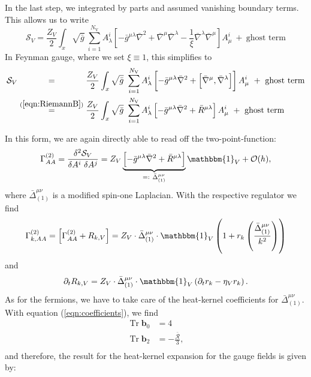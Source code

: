 In the last step, we integrated by parts and assumed vanishing boundary terms.\\
 This allows us to write 
\begin{equation}
\mathcal{S}_V = \frac{Z_{V}}{2} \int_x \sqrt{\bar{g}} \ \sum\limits_{i=1}^{N_{\text{V}}} A_{\lambda}^{i}\left[ - \bar{g}^{\mu\lambda}\bar{\nabla}^2 +  \bar{\nabla}^{\mu}\bar{\nabla}^{\lambda} - \frac{1}{\xi} \bar{\nabla}^{\lambda}\bar{\nabla}^{\mu}\right]A_{\mu}^{i} \ + \ \text{ghost term}
\end{equation}
In Feynman gauge, where we set $\xi \equiv 1$, this simplifies to
\begin{equation}
\begin{aligned}
\mathcal{S}_V &\overset{\phantom{(\mathrm{\ref{eqn:RiemannB}})}}{=} \frac{Z_{V}}{2} \int_x \sqrt{\bar{g}} \ \sum\limits_{i=1}^{N_{\text{V}}} A_{\lambda}^{i}\left[ - \bar{g}^{\mu\lambda}\bar{\nabla}^2 +  \left[\bar{\nabla}^{\mu}, \bar{\nabla}^{\lambda}\right]\right]A_{\mu}^{i} \ + \ \text{ghost term} \\
&\overset{(\mathrm{\ref{eqn:RiemannB}})}{=} \frac{Z_{V}}{2} \int_x \sqrt{\bar{g}} \ \sum\limits_{i=1}^{N_{\text{V}}} A_{\lambda}^{i}\left[ - \bar{g}^{\mu\lambda}\bar{\nabla}^2 +  \bar{R}^{\mu\lambda}\right]A_{\mu}^{i} \ + \ \text{ghost term}
\end{aligned}
\end{equation}

In this form, we are again directly able to read off the two-point-function:
\begin{equation}
	\Gamma^{(2)}_{AA} = \frac{\delta^2 \mathcal{S}_V}{\delta A^{i}\ \delta A^{j}} = Z_V\underbrace{\left[ - \bar{g}^{\mu\lambda}\bar{\nabla}^2 +  \bar{R}^{\mu\lambda}\right]}_{=: \  \bar{\Delta}^{\mu\nu}_{(1)}}\mathbbm{1}_V + \mathcal{O}(h),
\end{equation} 
where $\bar{\Delta}^{\mu\nu}_{(1)}$ is a modified spin-one Laplacian. With the respective regulator we find
\begin{align}
	\Gamma^{(2)}_{k, AA} = \left[\Gamma^{(2)}_{AA}+ R_{k, V}\right]  = Z_V \cdot\bar{\Delta}_{(1)}^{\mu\nu}\cdot\mathbbm{1}_V\left(1 + r_k\left(\frac{\bar{\Delta}_{(1)}^{\mu\nu}}{k^2}\right)\right)
\end{align}
and 
\begin{align}
	\partial_t R_{k, V} = Z_V\cdot\bar{\Delta}_{(1)}^{\mu\nu}\cdot\mathbbm{1}_V\left(\partial_t r_k - \eta_V r_k\right).
\end{align}
As for the fermions, we have to take care of the heat-kernel coefficients for $\bar{\Delta}^{\mu\nu}_{(1)}$. With equation (\ref{eqn:coefficients}), we find 
\begin{equation}
\begin{aligned}
	\operatorname{Tr}\mathbf{b}_0 &= 4 \\
	\operatorname{Tr}\mathbf{b}_2 &= -\frac{\bar{\mathcal{R}}}{3}, \\
\end{aligned} 
\end{equation}
and therefore, the result for the heat-kernel expansion for the gauge fields is given by:

